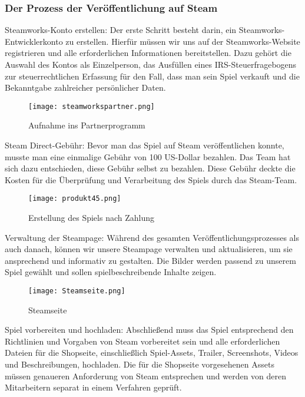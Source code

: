 \subsubsection{Der Prozess der Veröffentlichung auf Steam}\label{subsubsec:Veröffentlichungsprozess}

Steamworks-Konto erstellen:
Der erste Schritt besteht darin, ein Steamworks-Entwicklerkonto zu erstellen.
Hierfür müssen wir uns auf der Steamworks-Website registrieren und alle erforderlichen Informationen bereitstellen.
Dazu gehört die Auswahl des Kontos als Einzelperson, das Ausfüllen eines IRS-Steuerfragebogens zur steuerrechtlichen Erfassung für den Fall, dass man sein Spiel verkauft und die Bekanntgabe zahlreicher persönlicher Daten.

\begin{figure}[H]
    \centering
    \texttt{[image: steamworkspartner.png]}
    \caption{Aufnahme ins Partnerprogramm}
\end{figure}

Steam Direct-Gebühr:
Bevor man das Spiel auf Steam veröffentlichen konnte, musste man eine einmalige Gebühr von 100 US-Dollar bezahlen.
Das Team hat sich dazu entschieden, diese Gebühr selbst zu bezahlen.
Diese Gebühr deckte die Kosten für die Überprüfung und Verarbeitung des Spiels durch das Steam-Team.
\begin{figure}[H]
    \centering
    \texttt{[image: produkt45.png]}
    \caption{Erstellung des Spiels nach Zahlung}
\end{figure}

Verwaltung der Steampage: Während des gesamten Veröffentlichungsprozesses als auch danach, können wir unsere Steampage verwalten und aktualisieren, um sie ansprechend und informativ zu gestalten.
Die Bilder werden passend zu unserem Spiel gewählt und sollen spielbeschreibende Inhalte zeigen.
\begin{figure}[H]
    \centering
    \texttt{[image: Steamseite.png]}
    \caption{Steamseite}
\end{figure}

Spiel vorbereiten und hochladen:
Abschließend muss das Spiel entsprechend den Richtlinien und Vorgaben von Steam vorbereitet sein und alle erforderlichen Dateien für die Shopseite, einschließlich Spiel-Assets, Trailer, Screenshots, Videos und Beschreibungen, hochladen.
Die für die Shopseite vorgesehenen Assets müssen genaueren Anforderung von Steam entsprechen und werden von deren Mitarbeitern separat in einem Verfahren geprüft.


